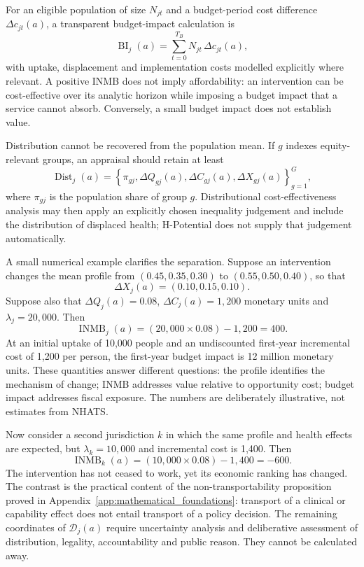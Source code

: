 For an eligible population of size $N_{jt}$ and a budget-period cost difference
$\Delta c_{jt}(a)$, a transparent budget-impact calculation is
\[
\operatorname{BI}_j(a)=
\sum_{t=0}^{T_B}N_{jt}\,\Delta c_{jt}(a),
\]
with uptake, displacement and implementation costs modelled explicitly where
relevant. A positive INMB does not imply affordability: an intervention can be
cost-effective over its analytic horizon while imposing a budget impact that a
service cannot absorb. Conversely, a small budget impact does not establish
value.

Distribution cannot be recovered from the population mean. If $g$ indexes
equity-relevant groups, an appraisal should retain at least
\[
\operatorname{Dist}_j(a)=
\left\{\pi_{gj},\Delta Q_{gj}(a),\Delta C_{gj}(a),
\Delta X_{gj}(a)\right\}_{g=1}^{G},
\]
where $\pi_{gj}$ is the population share of group $g$. Distributional
cost-effectiveness analysis may then apply an explicitly chosen inequality
judgement and include the distribution of displaced health; H-Potential does
not supply that judgement automatically. \citep{asaria_2016_dcea}

A small numerical example clarifies the separation. Suppose an intervention
changes the mean profile from $(0.45,0.35,0.30)$ to
$(0.55,0.50,0.40)$, so that
\[
\Delta X_j(a)=(0.10,0.15,0.10).
\]
Suppose also that $\Delta Q_j(a)=0.08$, $\Delta C_j(a)=1{,}200$ monetary
units and $\lambda_j=20{,}000$. Then
\[
\operatorname{INMB}_j(a)
=(20{,}000\times0.08)-1{,}200=400.
\]
At an initial uptake of 10,000 people and an undiscounted first-year incremental
cost of 1,200 per person, the first-year budget impact is 12 million monetary
units. These quantities answer different questions: the profile identifies the
mechanism of change; INMB addresses value relative to opportunity cost; budget
impact addresses fiscal exposure. The numbers are deliberately illustrative,
not estimates from NHATS.

Now consider a second jurisdiction $k$ in which the same profile and health
effects are expected, but $\lambda_k=10{,}000$ and incremental cost is 1,400.
Then
\[
\operatorname{INMB}_k(a)
=(10{,}000\times0.08)-1{,}400=-600.
\]
The intervention has not ceased to work, yet its economic ranking has changed.
The contrast is the practical content of the non-transportability proposition
proved in Appendix~\ref{app:mathematical_foundations}: transport of a clinical
or capability effect does not entail transport of a policy decision. The
remaining coordinates of $\mathcal D_j(a)$ require uncertainty analysis and
deliberative assessment of distribution, legality, accountability and public
reason. They cannot be calculated away.

